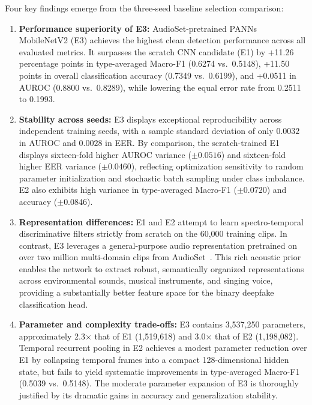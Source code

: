 Four key findings emerge from the three-seed baseline selection comparison:

\begin{enumerate}[label=\textbf{\arabic*.},leftmargin=*,itemsep=0.3em]
  \item \textbf{Performance superiority of E3:} AudioSet-pretrained PANNs MobileNetV2 (E3) achieves the highest clean detection performance across all evaluated metrics. It surpasses the scratch CNN candidate (E1) by +11.26 percentage points in type-averaged Macro-F1 (0.6274 vs.\ 0.5148), +11.50 points in overall classification accuracy (0.7349 vs.\ 0.6199), and +0.0511 in AUROC (0.8800 vs.\ 0.8289), while lowering the equal error rate from 0.2511 to 0.1993.
  \item \textbf{Stability across seeds:} E3 displays exceptional reproducibility across independent training seeds, with a sample standard deviation of only $0.0032$ in AUROC and $0.0028$ in EER. By comparison, the scratch-trained E1 displays sixteen-fold higher AUROC variance ($\pm 0.0516$) and sixteen-fold higher EER variance ($\pm 0.0460$), reflecting optimization sensitivity to random parameter initialization and stochastic batch sampling under class imbalance. E2 also exhibits high variance in type-averaged Macro-F1 ($\pm 0.0720$) and accuracy ($\pm 0.0846$).
  \item \textbf{Representation differences:} E1 and E2 attempt to learn spectro-temporal discriminative filters strictly from scratch on the 60{,}000 training clips. In contrast, E3 leverages a general-purpose audio representation pretrained on over two million multi-domain clips from AudioSet~\cite{kong2020panns}. This rich acoustic prior enables the network to extract robust, semantically organized representations across environmental sounds, musical instruments, and singing voice, providing a substantially better feature space for the binary deepfake classification head.
  \item \textbf{Parameter and complexity trade-offs:} E3 contains 3{,}537{,}250 parameters, approximately 2.3$\times$ that of E1 (1{,}519{,}618) and 3.0$\times$ that of E2 (1{,}198{,}082). Temporal recurrent pooling in E2 achieves a modest parameter reduction over E1 by collapsing temporal frames into a compact 128-dimensional hidden state, but fails to yield systematic improvements in type-averaged Macro-F1 (0.5039 vs.\ 0.5148). The moderate parameter expansion of E3 is thoroughly justified by its dramatic gains in accuracy and generalization stability.
\end{enumerate}

